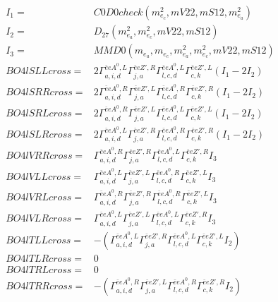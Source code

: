 \documentclass[A4,landscape]{article}
\begin{document}
\begin{align} 
I_1 = & C0D0check(m^2_{e_{{c}}}, mV22, mS12, m^2_{e_{{a}}}) \\ 
I_2 = & D_{27}(m^2_{e_{{a}}}, m^2_{e_{{c}}}, mV22, mS12) \\ 
I_3 = & MMD0(m_{e_{{a}}}, m_{e_{{c}}}, m^2_{e_{{a}}}, m^2_{e_{{c}}}, mV22, mS12) \\ 
  BO4lSLLcross= & 2  \Gamma^{\bar{e}e A^0 ,L}_{a, i, d} \Gamma^{\bar{e}e {Z'} ,R}_{j, a} \Gamma^{\bar{e}e A^0 ,L}_{l, c, d} \Gamma^{\bar{e}e {Z'} ,L}_{c, k} (I_1 - 2 I_2) \\ 
  BO4lSRRcross= & 2  \Gamma^{\bar{e}e A^0 ,R}_{a, i, d} \Gamma^{\bar{e}e {Z'} ,L}_{j, a} \Gamma^{\bar{e}e A^0 ,R}_{l, c, d} \Gamma^{\bar{e}e {Z'} ,R}_{c, k} (I_1 - 2 I_2) \\ 
  BO4lSRLcross= & 2  \Gamma^{\bar{e}e A^0 ,R}_{a, i, d} \Gamma^{\bar{e}e {Z'} ,L}_{j, a} \Gamma^{\bar{e}e A^0 ,L}_{l, c, d} \Gamma^{\bar{e}e {Z'} ,L}_{c, k} (I_1 - 2 I_2) \\ 
  BO4lSLRcross= & 2  \Gamma^{\bar{e}e A^0 ,L}_{a, i, d} \Gamma^{\bar{e}e {Z'} ,R}_{j, a} \Gamma^{\bar{e}e A^0 ,R}_{l, c, d} \Gamma^{\bar{e}e {Z'} ,R}_{c, k} (I_1 - 2 I_2) \\ 
  BO4lVRRcross= &  \Gamma^{\bar{e}e A^0 ,R}_{a, i, d} \Gamma^{\bar{e}e {Z'} ,R}_{j, a} \Gamma^{\bar{e}e A^0 ,L}_{l, c, d} \Gamma^{\bar{e}e {Z'} ,R}_{c, k} I_3 \\ 
  BO4lVLLcross= &  \Gamma^{\bar{e}e A^0 ,L}_{a, i, d} \Gamma^{\bar{e}e {Z'} ,L}_{j, a} \Gamma^{\bar{e}e A^0 ,R}_{l, c, d} \Gamma^{\bar{e}e {Z'} ,L}_{c, k} I_3 \\ 
  BO4lVRLcross= &  \Gamma^{\bar{e}e A^0 ,R}_{a, i, d} \Gamma^{\bar{e}e {Z'} ,R}_{j, a} \Gamma^{\bar{e}e A^0 ,R}_{l, c, d} \Gamma^{\bar{e}e {Z'} ,L}_{c, k} I_3 \\ 
  BO4lVLRcross= &  \Gamma^{\bar{e}e A^0 ,L}_{a, i, d} \Gamma^{\bar{e}e {Z'} ,L}_{j, a} \Gamma^{\bar{e}e A^0 ,L}_{l, c, d} \Gamma^{\bar{e}e {Z'} ,R}_{c, k} I_3 \\ 
  BO4lTLLcross= & -( \Gamma^{\bar{e}e A^0 ,L}_{a, i, d} \Gamma^{\bar{e}e {Z'} ,R}_{j, a} \Gamma^{\bar{e}e A^0 ,L}_{l, c, d} \Gamma^{\bar{e}e {Z'} ,L}_{c, k} I_2) \\ 
  BO4lTLRcross= & 0 \\ 
  BO4lTRLcross= & 0 \\ 
  BO4lTRRcross= & -( \Gamma^{\bar{e}e A^0 ,R}_{a, i, d} \Gamma^{\bar{e}e {Z'} ,L}_{j, a} \Gamma^{\bar{e}e A^0 ,R}_{l, c, d} \Gamma^{\bar{e}e {Z'} ,R}_{c, k} I_2) \\ 
\end{align} 
\end{document}

